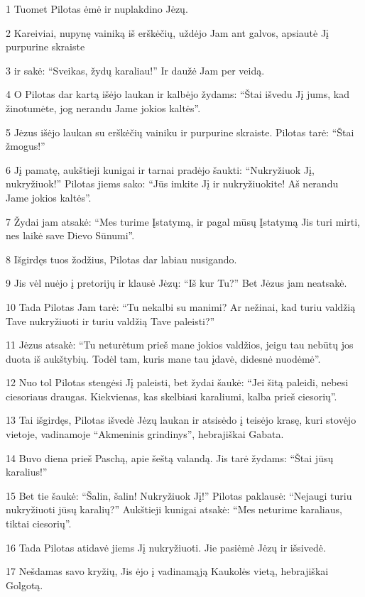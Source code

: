 \par 1 Tuomet Pilotas ėmė ir nuplakdino Jėzų. 
\par 2 Kareiviai, nupynę vainiką iš erškėčių, uždėjo Jam ant galvos, apsiautė Jį purpurine skraiste 
\par 3 ir sakė: “Sveikas, žydų karaliau!” Ir daužė Jam per veidą. 
\par 4 O Pilotas dar kartą išėjo laukan ir kalbėjo žydams: “Štai išvedu Jį jums, kad žinotumėte, jog nerandu Jame jokios kaltės”. 
\par 5 Jėzus išėjo laukan su erškėčių vainiku ir purpurine skraiste. Pilotas tarė: “Štai žmogus!” 
\par 6 Jį pamatę, aukštieji kunigai ir tarnai pradėjo šaukti: “Nukryžiuok Jį, nukryžiuok!” Pilotas jiems sako: “Jūs imkite Jį ir nukryžiuokite! Aš nerandu Jame jokios kaltės”. 
\par 7 Žydai jam atsakė: “Mes turime Įstatymą, ir pagal mūsų Įstatymą Jis turi mirti, nes laikė save Dievo Sūnumi”. 
\par 8 Išgirdęs tuos žodžius, Pilotas dar labiau nusigando. 
\par 9 Jis vėl nuėjo į pretorijų ir klausė Jėzų: “Iš kur Tu?” Bet Jėzus jam neatsakė. 
\par 10 Tada Pilotas Jam tarė: “Tu nekalbi su manimi? Ar nežinai, kad turiu valdžią Tave nukryžiuoti ir turiu valdžią Tave paleisti?” 
\par 11 Jėzus atsakė: “Tu neturėtum prieš mane jokios valdžios, jeigu tau nebūtų jos duota iš aukštybių. Todėl tam, kuris mane tau įdavė, didesnė nuodėmė”. 
\par 12 Nuo tol Pilotas stengėsi Jį paleisti, bet žydai šaukė: “Jei šitą paleidi, nebesi ciesoriaus draugas. Kiekvienas, kas skelbiasi karaliumi, kalba prieš ciesorių”. 
\par 13 Tai išgirdęs, Pilotas išvedė Jėzų laukan ir atsisėdo į teisėjo krasę, kuri stovėjo vietoje, vadinamoje “Akmeninis grindinys”, hebrajiškai Gabata. 
\par 14 Buvo diena prieš Paschą, apie šeštą valandą. Jis tarė žydams: “Štai jūsų karalius!” 
\par 15 Bet tie šaukė: “Šalin, šalin! Nukryžiuok Jį!” Pilotas paklausė: “Nejaugi turiu nukryžiuoti jūsų karalių?” Aukštieji kunigai atsakė: “Mes neturime karaliaus, tiktai ciesorių”. 
\par 16 Tada Pilotas atidavė jiems Jį nukryžiuoti. Jie pasiėmė Jėzų ir išsivedė. 
\par 17 Nešdamas savo kryžių, Jis ėjo į vadinamąją Kaukolės vietą, hebrajiškai Golgotą. 

